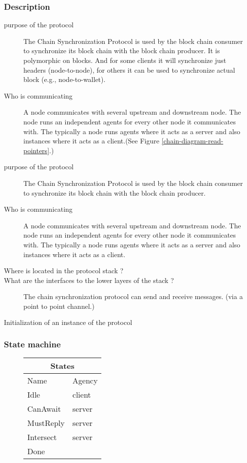 \documentclass{report}
\theoremstyle{definition}{
  \newtheorem{lemma}{Lemma}[section] %
  \newtheorem{definition}[lemma]{Definition}
}
\theoremstyle{theorem}{
  \newtheorem{invariant}[lemma]{Invariant}
  \newtheorem{proofobligation}[lemma]{Proof Obligation}
}
\numberwithin{equation}{lemma}
\begin{document}
\subsubsection{Description}
\begin{description}
\item[purpose of the protocol]

The Chain Synchronization Protocol is used by the block chain consumer
to synchronize its block chain with the block chain producer.
It is polymorphic on blocks. And for some clients it will synchronize just headers (node-to-node),
for others it can be used to synchronize actual block (e.g., node-to-wallet).

\item[Who is communicating]
  A node communicates with several upstream and downstream node.
  The node runs an independent agents for every other node
  it communicates with. The typically a node runs agents where it acts as a server and also instances
  where it acts as a client.(See Figure \ref{chain-diagram-read-pointers}.)
\end{description}


\begin{description}
\item[purpose of the protocol]
The Chain Synchronization Protocol is used by the block chain consumer
to synchronize its block chain with the block chain producer.
\item[Who is communicating]
  A node communicates with several upstream and downstream node.
  The node runs an independent agents for every other node
  it communicates with. The typically a node runs agents where it acts as a server and also instances
  where it acts as a client.
\item[Where is located in the protocol stack ?]
\item[What are the interfaces to the lower layers of the stack ?]
  The chain synchronization protocol can send and receive messages. (via a point to point channel.)
\item[Initialization of an instance of the protocol]
\end{description}

\subsubsection{State machine}
\begin{figure}[H]
\begin{tabular}{|l|l|}
  \hline
  \multicolumn{2}{|c|}{States} \\ \hline
  Name  & Agency \\ \hline \hline
  Idle       & client \\ \hline
  CanAwait   & server \\ \hline
  MustReply  & server \\ \hline
  Intersect  & server \\ \hline
  Done       &        \\ \hline
  \hline
\end{tabular}
\end{figure}
\end{document}
